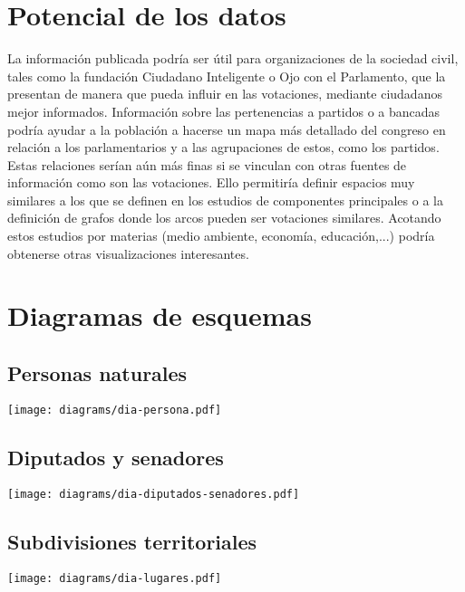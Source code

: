 \documentclass[letterpaper,titlepage]{article}
\begin{document}


\section{Potencial de los datos}

La información publicada podría ser útil para organizaciones de la
sociedad civil, tales como la fundación Ciudadano Inteligente o Ojo
con el Parlamento, que la presentan de manera que pueda influir en las
votaciones, mediante ciudadanos mejor informados. Información sobre
las pertenencias a partidos o a bancadas podría ayudar a la población
a hacerse un mapa más detallado del congreso en relación a los
parlamentarios y a las agrupaciones de estos, como los partidos. Estas
relaciones serían aún más finas si se vinculan con otras fuentes de
información como son las votaciones. Ello permitiría definir espacios
muy similares a los que se definen en los estudios de componentes
principales o a la definición de grafos donde los arcos pueden ser
votaciones similares. Acotando estos estudios por materias (medio
ambiente, economía, educación,...) podría obtenerse otras
visualizaciones interesantes.

\newpage
\appendix

\section{Diagramas de esquemas}
\label{diagramas}

\subsection{Personas naturales}
\begin{center}
  \texttt{[image: diagrams/dia-persona.pdf]}
\end{center}

\subsection{Diputados y senadores}
\begin{center}
  \texttt{[image: diagrams/dia-diputados-senadores.pdf]}
\end{center}

\subsection{Subdivisiones territoriales}
\begin{center}
  \texttt{[image: diagrams/dia-lugares.pdf]}
\end{center}
\end{document}
